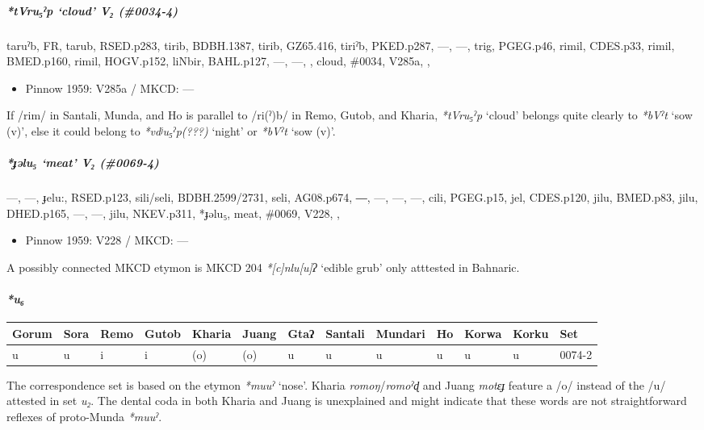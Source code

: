 \documentclass[a4paper,]{article}
\providecommand{\tightlist}{%
  \setlength{\itemsep}{0pt}\setlength{\parskip}{0pt}}
\let\oldparagraph\paragraph
\renewcommand{\paragraph}[1]{\oldparagraph{#1}\mbox{}}
\let\oldsubparagraph\subparagraph
\renewcommand{\subparagraph}[1]{\oldsubparagraph{#1}\mbox{}}
\begin{document}
\subparagraph{\texorpdfstring{\emph{*tVru₅ˀp} `cloud' V₂
(\#0034-4)}{*tVru₅ˀp cloud V₂ (\#0034-4)}}\label{tvruux2c0p-cloud-v-0034-4}

taruˀb, FR, tarub, RSED.p283, tirib, BDBH.1387, tirib, GZ65.416, tiriˀb,
PKED.p287, ---, ---, trig, PGEG.p46, rimil, CDES.p33, rimil, BMED.p160,
rimil, HOGV.p152, liNbir, BAHL.p127, ---, ---, , cloud, \#0034, V285a, ,

\begin{itemize}
\tightlist
\item
  Pinnow 1959: V285a / MKCD: ---
\end{itemize}

If /rim/ in Santali, Munda, and Ho is parallel to /ri(ˀ)b/ in Remo,
Gutob, and Kharia, \emph{*tVru₅ˀp} `cloud' belongs quite clearly to
\emph{*bVˀt} `sow (v)', else it could belong to \emph{*vdʲu₅ˀp(???)}
`night' or \emph{*bVˀt} `sow (v)'.

\subparagraph{\texorpdfstring{\emph{*ɟəlu₅} `meat' V₂
(\#0069-4)}{*ɟəlu₅ meat V₂ (\#0069-4)}}\label{ux25fux259lu-meat-v-0069-4}

---, ---, ɟelu:, RSED.p123, sili/seli, BDBH.2599/2731, seli, AG08.p674,
―, ---, ---, ---, cili, PGEG.p15, jel, CDES.p120, jilu, BMED.p83, jilu,
DHED.p165, ---, ---, jilu, NKEV.p311, *ɟəlu₅, meat, \#0069, V228, ,

\begin{itemize}
\tightlist
\item
  Pinnow 1959: V228 / MKCD: ---
\end{itemize}

A possibly connected MKCD etymon is MKCD 204 \emph{*{[}c{]}nlu{[}u{]}ʔ}
`edible grub' only atttested in Bahnaric.

\paragraph{\texorpdfstring{\emph{*u₆}}{*u₆}}\label{u-4}

\begin{longtable}[]{@{}lllllllllllll@{}}
\toprule
Gorum & Sora & Remo & Gutob & Kharia & Juang & Gtaʔ & Santali & Mundari
& Ho & Korwa & Korku & Set\tabularnewline
\midrule
\endhead
u & u & i & i & (o) & (o) & u & u & u & u & u & u &
0074-2\tabularnewline
\bottomrule
\end{longtable}

The correspondence set is based on the etymon \emph{*muuˀ} `nose'.
Kharia \emph{romoŋ}/\emph{romoˀɖ} and Juang \emph{motɛɟ} feature a /o/
instead of the /u/ attested in set \emph{u₂}. The dental coda in both
Kharia and Juang is unexplained and might indicate that these words are
not straightforward reflexes of proto-Munda \emph{*muuˀ}.
\end{document}
